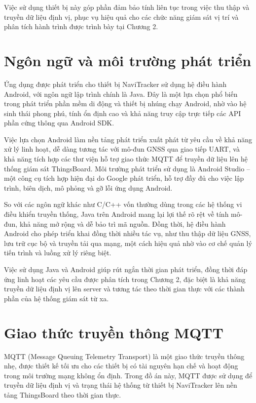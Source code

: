 \documentclass[../DoAn.tex]{subfiles}
\begin{document}
Việc sử dụng thiết bị này góp phần đảm bảo tính liên tục trong việc thu thập và truyền dữ liệu định vị, phục vụ hiệu quả cho các chức năng giám sát vị trí và phân tích hành trình được trình bày tại Chương 2.
\section{Ngôn ngữ và môi trường phát triển}
\label{section:3.2}
Ứng dụng được phát triển cho thiết bị NaviTracker sử dụng hệ điều hành Android, với ngôn ngữ lập trình chính là Java. Đây là một lựa chọn phổ biến trong phát triển phần mềm di động và thiết bị nhúng chạy Android, nhờ vào hệ sinh thái phong phú, tính ổn định cao và khả năng truy cập trực tiếp các API phần cứng thông qua Android SDK.

Việc lựa chọn Android làm nền tảng phát triển xuất phát từ yêu cầu về khả năng xử lý linh hoạt, dễ dàng tương tác với mô-đun GNSS qua giao tiếp UART, và khả năng tích hợp các thư viện hỗ trợ giao thức MQTT để truyền dữ liệu lên hệ thống giám sát ThingsBoard. Môi trường phát triển sử dụng là Android Studio – một công cụ tích hợp hiện đại do Google phát triển, hỗ trợ đầy đủ cho việc lập trình, biên dịch, mô phỏng và gỡ lỗi ứng dụng Android.

So với các ngôn ngữ khác như C/C++ vốn thường dùng trong các hệ thống vi điều khiển truyền thống, Java trên Android mang lại lợi thế rõ rệt về tính mô-đun, khả năng mở rộng và dễ bảo trì mã nguồn. Đồng thời, hệ điều hành Android cho phép triển khai đồng thời nhiều tác vụ, như thu thập dữ liệu GNSS, lưu trữ cục bộ và truyền tải qua mạng, một cách hiệu quả nhờ vào cơ chế quản lý tiến trình và luồng xử lý riêng biệt.

Việc sử dụng Java và Android giúp rút ngắn thời gian phát triển, đồng thời đáp ứng linh hoạt các yêu cầu được phân tích trong Chương 2, đặc biệt là khả năng truyền dữ liệu định vị lên server và tương tác theo thời gian thực với các thành phần của hệ thống giám sát từ xa.
\section{Giao thức truyền thông MQTT}
\label{section:3.3}
MQTT (Message Queuing Telemetry Transport) là một giao thức truyền thông nhẹ, được thiết kế tối ưu cho các thiết bị có tài nguyên hạn chế và hoạt động trong môi trường mạng không ổn định. Trong đồ án này, MQTT được sử dụng để truyền dữ liệu định vị và trạng thái hệ thống từ thiết bị NaviTracker lên nền tảng ThingsBoard theo thời gian thực.
\end{document}
